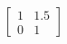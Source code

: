\documentclass[preview]{standalone}
\begin{document}
\begin{align*}
\begin{bmatrix} 1 & 1.5 \\ 0 & 1 \end{bmatrix}
\end{align*}
\end{document}
